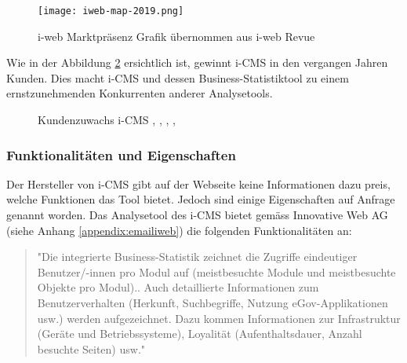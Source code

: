 \begin{figure}[h]
  \centering
  \texttt{[image: iweb-map-2019.png]}
  \caption{i-web Marktpräsenz Grafik übernommen aus i-web Revue \parencite[S. 14]{iweb2019revue}}
  \label{fig: iwebmap2019}
\end{figure}

\newpage

Wie in der Abbildung \ref{fig:icmszuwachs} ersichtlich ist, gewinnt i-CMS in den vergangen Jahren Kunden. Dies macht i-CMS und dessen Business-Statistiktool zu einem ernstzunehmenden Konkurrenten anderer Analysetools.  

\begin{figure}[h]
  \centering
  \caption{Kundenzuwachs i-CMS \parencite[S.7]{iweb2015revue}, \parencite[S. 7]{iweb2016revue}, \parencite[S. 7]{iweb2017revue}, \parencite[S. 14]{iweb2018revue}, \parencite[S. 14]{iweb2019revue}}
  \label{fig:icmszuwachs}
\end{figure}

\subsubsection{Funktionalitäten und Eigenschaften}
Der Hersteller von i-CMS gibt auf der Webseite keine Informationen dazu preis, welche Funktionen das Tool bietet. Jedoch sind einige Eigenschaften auf Anfrage genannt worden. Das Analysetool des i-CMS bietet gemäss Innovative Web AG (siehe Anhang \ref{appendix:emailiweb}) die folgenden Funktionalitäten an:

\begin{quote}
  "Die integrierte Business-Statistik zeichnet die Zugriffe eindeutiger Benutzer/-innen pro Modul auf (meistbesuchte Module und meistbesuchte Objekte pro Modul).. Auch detaillierte Informationen zum Benutzerverhalten (Herkunft, Suchbegriffe, Nutzung eGov-Applikationen usw.) werden aufgezeichnet. Dazu kommen Informationen zur Infrastruktur (Geräte und Betriebssysteme), Loyalität (Aufenthaltsdauer, Anzahl besuchte Seiten) usw."
\end{quote}

